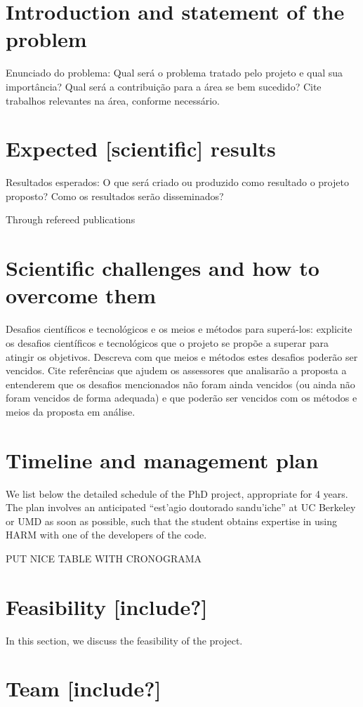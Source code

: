 \section{Introduction and statement of the
problem}\label{introduction-and-statement-of-the-problem}

\label{sec:intro}

Enunciado do problema: Qual será o problema tratado pelo projeto e qual
sua importância? Qual será a contribuição para a área se bem sucedido?
Cite trabalhos relevantes na área, conforme necessário.

\section{Expected {[}scientific{]}
results}\label{expected-scientific-results}

\label{sec:project}

Resultados esperados: O que será criado ou produzido como resultado o
projeto proposto? Como os resultados serão disseminados?

Through refereed publications

\section{Scientific challenges and how to overcome
them}\label{scientific-challenges-and-how-to-overcome-them}

\label{sec:results}

Desafios científicos e tecnológicos e os meios e métodos para
superá-los: explicite os desafios científicos e tecnológicos que o
projeto se propõe a superar para atingir os objetivos. Descreva com que
meios e métodos estes desafios poderão ser vencidos. Cite referências
que ajudem os assessores que analisarão a proposta a entenderem que os
desafios mencionados não foram ainda vencidos (ou ainda não foram
vencidos de forma adequada) e que poderão ser vencidos com os métodos e
meios da proposta em análise.

\section{Timeline and management
plan}\label{timeline-and-management-plan}

\label{sec:time}

We list below the detailed schedule of the PhD project, appropriate for
4 years. The plan involves an anticipated ``est'agio doutorado
sandu'iche'' at UC Berkeley or UMD as soon as possible, such that the
student obtains expertise in using HARM with one of the developers of
the code.

PUT NICE TABLE WITH CRONOGRAMA

\section{Feasibility {[}include?{]}}\label{feasibility-include}

\label{sec:feasible}

In this section, we discuss the feasibility of the project.

\section{Team {[}include?{]}}\label{team-include}
